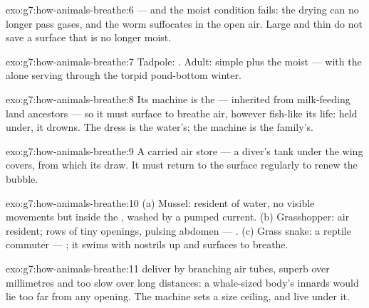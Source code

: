 \begin{solution}{exo:g7:how-animals-breathe:6}
 --- and the moist condition fails: the drying
 can no longer pass gases, and the worm suffocates in
the open air. Large and thin do not save a surface that is
no longer moist.
\end{solution}

\begin{solution}{exo:g7:how-animals-breathe:7}
Tadpole: . Adult: simple  plus the moist  ---
with the  alone serving through the torpid pond-bottom
winter.
\end{solution}

\begin{solution}{exo:g7:how-animals-breathe:8}
Its machine is the  --- inherited from milk-feeding land
ancestors --- so it must surface to breathe air, however
fish-like its life: held under, it drowns. The dress is the
water's; the machine is the family's.
\end{solution}

\begin{solution}{exo:g7:how-animals-breathe:9}
A carried air store --- a diver's tank under the wing
covers, from which its  draw. It must return to the
surface regularly to renew the bubble.
\end{solution}

\begin{solution}{exo:g7:how-animals-breathe:10}
(a) Mussel: resident of water, no visible movements but
 inside the , washed by a pumped current. (b)
Grasshopper: air resident; rows of tiny openings, pulsing
abdomen --- . (c) Grass snake: a reptile commuter
--- ; it swims with nostrils up and surfaces to
breathe.
\end{solution}

\begin{solution}{exo:g7:how-animals-breathe:11}
 deliver by branching air tubes, superb over
millimetres and too slow over long distances: a whale-sized
body's innards would lie too far from any opening. The
machine sets a size ceiling, and  live under it.
\end{solution}

